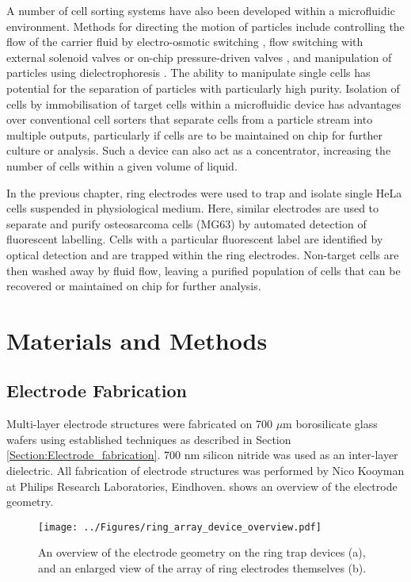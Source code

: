 A number of cell sorting systems have also been developed within a microfluidic environment. Methods for directing the motion of particles include controlling the flow of the carrier fluid by electro-osmotic switching \citep{Fu:1999}, flow switching with external solenoid valves \citep{Wolff:2003} or on-chip pressure-driven valves \citep{Fu:2002}, and manipulation of particles using dielectrophoresis \citep{Holmes:2005}. The ability to manipulate single cells has potential for the separation of particles with particularly high purity. Isolation of cells by immobilisation of target cells within a microfluidic device has advantages over conventional cell sorters that separate cells from a particle stream into multiple outputs, particularly if cells are to be maintained on chip for further culture or analysis. Such a device can also act as a concentrator, increasing the number of cells within a given volume of liquid.

In the previous chapter, ring electrodes were used to trap and isolate single HeLa cells suspended in physiological medium. Here, similar electrodes are used to separate and purify osteosarcoma cells (MG63) by automated detection of fluorescent labelling. Cells with a particular fluorescent label are identified by optical detection and are trapped within the ring electrodes. Non-target cells are then washed away by fluid flow, leaving a purified population of cells that can be recovered or maintained on chip for further analysis.


\section{Materials and Methods}

\subsection{Electrode Fabrication}
Multi-layer electrode structures were fabricated on 700 $\mu$m borosilicate glass wafers using established techniques as described in Section \ref{Section:Electrode_fabrication}. 700 nm silicon nitride was used as an inter-layer dielectric. All fabrication of electrode structures was performed by Nico Kooyman at Philips Research Laboratories, Eindhoven.  shows an overview of the electrode geometry.

\begin{figure}
	\centering
		\texttt{[image: ../Figures/ring\_array\_device\_overview.pdf]}
	\caption[An overview of the electrode geometry on the ring trap devices.]{An overview of the electrode geometry on the ring trap devices (a), and an enlarged view of the array of ring electrodes themselves (b).}
	\label{fig:ring_array_device_overview}
\end{figure}

